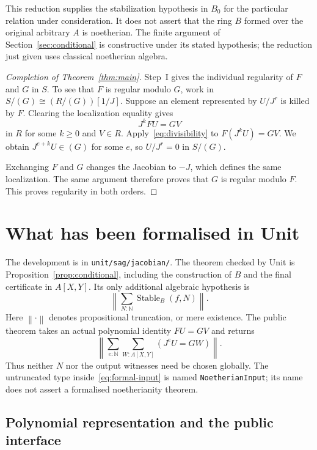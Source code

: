 \documentclass[11pt]{amsart}
\theoremstyle{definition}
\theoremstyle{remark}
\newcommand{\code}[1]{\texttt{#1}}
\newcommand{\mere}[1]{\left\lVert #1\right\rVert}
\begin{document}
This reduction supplies the stabilization hypothesis in $B_0$ for
the particular relation under consideration. It does not assert that
the ring $B$ formed over the original arbitrary $A$ is noetherian.
The finite argument of Section~\ref{sec:conditional} is constructive
under its stated hypothesis; the reduction just given uses classical
noetherian algebra.

\begin{proof}[Completion of Theorem~\ref{thm:main}]
Step~I gives the individual regularity of $F$ and $G$ in $S$.
To see that $F$ is regular modulo $G$, work in
$S/(G)\cong(R/(G))[1/J]$. Suppose an element represented by $U/J^r$
is killed by $F$. Clearing the localization equality gives
\[
 J^kFU=GV
\]
in $R$ for some $k\geq0$ and $V\in R$.
Apply~\eqref{eq:divisibility} to $F(J^kU)=GV$. We obtain
$J^{e+k}U\in(G)$ for some $e$, so $U/J^r=0$ in $S/(G)$.

Exchanging $F$ and $G$ changes the Jacobian to $-J$, which defines
the same localization. The same argument therefore proves that $G$
is regular modulo $F$. This proves regularity in both orders.
\end{proof}

\section{What has been formalised in Unit}\label{sec:formalisation}

The development is in \code{unit/sag/jacobian/}. The theorem checked
by Unit is Proposition~\ref{prop:conditional}, including the
construction of $B$ and the final certificate in $A[X,Y]$.
Its only additional algebraic hypothesis is
\begin{equation}\label{eq:formal-input}
 \mere{\sum_{N:\mathbb N}\operatorname{Stable}_B(f,N)}.
\end{equation}
Here $\mere{\cdot}$ denotes propositional truncation, or mere existence.
The public theorem takes an actual polynomial identity $FU=GV$ and
returns
\begin{equation}\label{eq:formal-output}
 \mere{\sum_{e:\mathbb N}\sum_{W:A[X,Y]}(J^eU=GW)}.
\end{equation}
Thus neither $N$ nor the output witnesses need be chosen globally.
The untruncated type inside~\eqref{eq:formal-input} is named
\code{NoetherianInput}; its name does not assert a formalised
noetherianity theorem.

\subsection*{Polynomial representation and the public interface}
\end{document}
